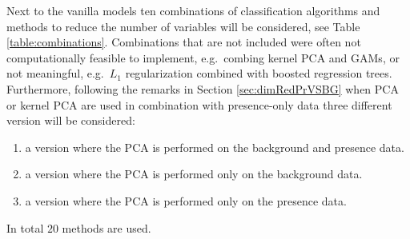 Next to the vanilla models ten combinations of classification algorithms and methods to reduce the number of variables will be considered, see Table \ref{table:combinations}. Combinations that are not included were often not computationally feasible to implement, e.g.\ combing kernel PCA and GAMs, or not meaningful, e.g.\ $L_1$ regularization combined with boosted regression trees. Furthermore, following the remarks in Section \ref{sec:dimRedPrVSBG} when PCA or kernel PCA are used in combination with presence-only data three different version will be considered: \begin{enumerate}
\item a version where the PCA is performed on the background and presence data.
\item a version where the PCA is performed only on the background data.
\item a version where the PCA is performed only on the presence data.
\end{enumerate}
In total $20$ methods are used.


\begin{table}[!htb]
\caption{\label{table:combinations}Table with the combinations of classification and dimensionality reduction techniques that are considered.}
\end{table}